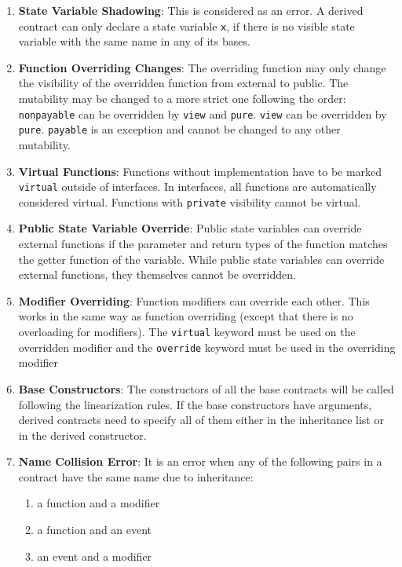 \begin{enumerate}
\item\textbf{State Variable Shadowing}: This is considered as an error. A derived contract can only declare a state variable \verb|x|, if there is no visible state variable with the same name in any of its bases.

\item\textbf{Function Overriding Changes}: The overriding function may only change the visibility of the overridden function from external to public. The mutability may be changed to a more strict one following the order: \verb|nonpayable| can be overridden by \verb|view| and \verb|pure|. \verb|view| can be overridden by \verb|pure|. \verb|payable| is an exception and cannot be changed to any other mutability.

\item\textbf{Virtual Functions}: Functions without implementation have to be marked \verb|virtual| outside of interfaces. In interfaces, all functions are automatically considered virtual. Functions with \verb|private| visibility cannot be virtual.

\item\textbf{Public State Variable Override}: Public state variables can override external functions if the parameter and return types of the function matches the getter function of the variable. While public state variables can override external functions, they themselves cannot be overridden.

\item\textbf{Modifier Overriding}: Function modifiers can override each other. This works in the same way as function overriding (except that there is no overloading for modifiers). The \verb|virtual| keyword must be used on the overridden modifier and the \verb|override| keyword must be used in the overriding modifier

\item\textbf{Base Constructors}: The constructors of all the base contracts will be called following the linearization rules. If the base constructors have arguments, derived contracts need to specify all of them either in the inheritance list or in the derived constructor.

\item\textbf{Name Collision Error}: It is an error when any of the following pairs in a contract have the same name due to inheritance:
    \begin{enumerate}
    \item a function and a modifier
    \item a function and an event
    \item an event and a modifier
    \end{enumerate}


\end{enumerate}

